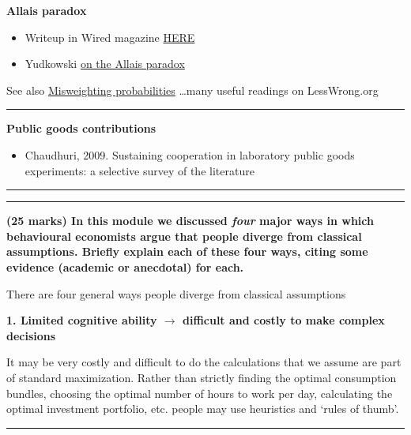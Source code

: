 \documentclass[]{article}
\providecommand{\tightlist}{%
  \setlength{\itemsep}{0pt}\setlength{\parskip}{0pt}}
\begin{document}
\textbf{Allais paradox}

\begin{itemize}
\item
  Writeup in Wired magazine \href{https://www.wired.com/2010/10/the-allais-paradox/}{HERE}
\item
  Yudkowski \href{http://lesswrong.com/lw/my/the_allais_paradox/}{on the Allais paradox}
\end{itemize}

See also \href{http://lesswrong.com/lw/ml/but_theres_still_a_chance_right/}{Misweighting probabilities} \ldots{}many useful readings on LessWrong.org

\begin{center}\rule{0.5\linewidth}{\linethickness}\end{center}

\textbf{Public goods contributions}

\begin{itemize}
\tightlist
\item
  Chaudhuri, 2009. Sustaining cooperation in laboratory public goods experiments: a selective survey of the literature
\end{itemize}

\begin{center}\rule{0.5\linewidth}{\linethickness}\end{center}

\begin{center}\rule{0.5\linewidth}{\linethickness}\end{center}

\textbf{(25 marks) In this module we discussed \textit{four} major ways in which behavioural economists argue that people diverge from classical assumptions. Briefly explain each of these four ways, citing some evidence (academic or anecdotal) for each.}

There are four general ways people diverge from classical assumptions

\textbf{1. Limited cognitive ability \(\rightarrow\) difficult and costly to make complex decisions}

It may be very costly and difficult to do the calculations that we assume are part of standard maximization. Rather than strictly finding the optimal consumption bundles, choosing the optimal number of hours to work per day, calculating the optimal investment portfolio, etc. people may use heuristics and `rules of thumb'.

\begin{center}\rule{0.5\linewidth}{\linethickness}\end{center}
\end{document}
